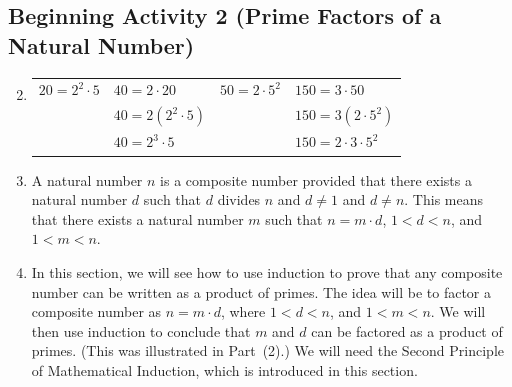 \documentclass[11pt]{article}
\begin{document}
\begin{enumerate}
\end{enumerate}
\hbreak



\subsection*{Beginning Activity 2 (Prime Factors of a Natural Number)}
\begin{enumerate}
\setcounter{enumi}{1}
\item 
\begin{tabular}[t]{p{1in} p{2in} p{1in} p{2in}}
$20 = 2^2 \cdot 5$ &  $40 = 2 \cdot 20$  & $50 = 2 \cdot 5^2$ & $150 = 3 \cdot 50$ \\
                   &  $40 = 2 ( {2^2 \cdot 5} )$  &  & $150 = 3 ( {2 \cdot 5^2} )$ \\
                   &  $40 = 2^3 \cdot 5$  &  & $150 = 2 \cdot 3 \cdot 5^2$ \\
\end{tabular}


\addtocounter{enumi}{1}
\item A natural number  $n$  is a composite number provided that there exists a natural number  
$d$  such that  $d$  divides  $n$  and  $d \ne 1$  and  $d \ne n$.  This means that there exists a natural number  $m$  such that  $n = m \cdot d$, $1 < d < n$, and  $1 < m < n$.

\item In this section, we will see how to use induction to prove that any composite number can be written as a product of primes.  The idea will be to factor a composite number as  
$n = m \cdot d$,  where  $1 < d < n$, and  $1 < m < n$.  We will then use induction to conclude that  $m$  and  $d$  can be factored as a product of primes.  (This was illustrated in 
Part~(2).)  We will need the Second Principle of Mathematical Induction, which is introduced in this section.
\end{enumerate}
\hbreak
\end{document}
